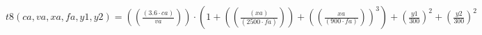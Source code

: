\documentclass[preview,border=1pt]{standalone}
\begin{document}
$
t8 (ca,va,xa,fa,y1,y2) = \left(\left(\frac{\left(\num{3.6}\cdot ca\right)}{va}\right)\right)\cdot \left(\num{1}+\left(\left(\frac{\left(xa\right)}{\left(\num{2500}\cdot fa\right)}\right)\right)+\left(\left(\frac{xa}{\left(\num{900}\cdot fa\right)}\right)\right)^{\num{3}}\right)+\left(\frac{y1}{\num{300}}\right)^{\num{2}}+\left(\frac{y2}{\num{300}}\right)^{\num{2}}
$
\end{document}
